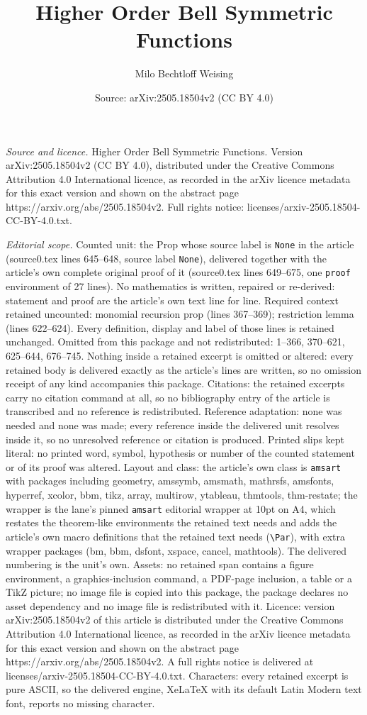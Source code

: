 \documentclass[10pt,a4paper]{amsart}
\title[Higher Order Bell Symmetric Functions]{Higher Order Bell Symmetric Functions}
\author{Milo Bechtloff Weising}
\date{Source: arXiv:2505.18504v2 (CC BY 4.0)}
\begin{document}
\maketitle

\noindent\emph{Source and licence.} Higher Order Bell Symmetric Functions. Version arXiv:2505.18504v2 (CC BY 4.0), distributed under the Creative Commons Attribution 4.0 International licence, as recorded in the arXiv licence metadata for this exact version and shown on the abstract page https://arxiv.org/abs/2505.18504v2. Full rights notice: licenses/arxiv-2505.18504-CC-BY-4.0.txt.\par\smallskip

\noindent\textit{Editorial scope.} Counted unit: the Prop whose source label is \texttt{None} in the article (source0.tex lines 645--648, source label \texttt{None}), delivered together with the article's own complete original proof of it (source0.tex lines 649--675, one \texttt{proof} environment of 27 lines). No mathematics is written, repaired or re-derived: statement and proof are the article's own text line for line. Required context retained uncounted: monomial recursion prop (lines 367--369); restriction lemma (lines 622--624). Every definition, display and label of those lines is retained unchanged. Omitted from this package and not redistributed: 1--366, 370--621, 625--644, 676--745. Nothing inside a retained excerpt is omitted or altered: every retained body is delivered exactly as the article's lines are written, so no omission receipt of any kind accompanies this package. Citations: the retained excerpts carry no citation command at all, so no bibliography entry of the article is transcribed and no reference is redistributed. Reference adaptation: none was needed and none was made; every reference inside the delivered unit resolves inside it, so no unresolved reference or citation is produced. Printed slips kept literal: no printed word, symbol, hypothesis or number of the counted statement or of its proof was altered. Layout and class: the article's own class is \texttt{amsart} with packages including geometry, amssymb, amsmath, mathrsfs, amsfonts, hyperref, xcolor, bbm, tikz, array, multirow, ytableau, thmtools, thm-restate; the wrapper is the lane's pinned \texttt{amsart} editorial wrapper at 10pt on A4, which restates the theorem-like environments the retained text needs and adds the article's own macro definitions that the retained text needs (\texttt{\textbackslash Par}), with extra wrapper packages (bm, bbm, dsfont, xspace, cancel, mathtools). The delivered numbering is the unit's own. Assets: no retained span contains a figure environment, a graphics-inclusion command, a PDF-page inclusion, a table or a TikZ picture; no image file is copied into this package, the package declares no asset dependency and no image file is redistributed with it. Licence: version arXiv:2505.18504v2 of this article is distributed under the Creative Commons Attribution 4.0 International licence, as recorded in the arXiv licence metadata for this exact version and shown on the abstract page https://arxiv.org/abs/2505.18504v2. A full rights notice is delivered at licenses/arxiv-2505.18504-CC-BY-4.0.txt. Characters: every retained excerpt is pure ASCII, so the delivered engine, XeLaTeX with its default Latin Modern text font, reports no missing character.
\end{document}
